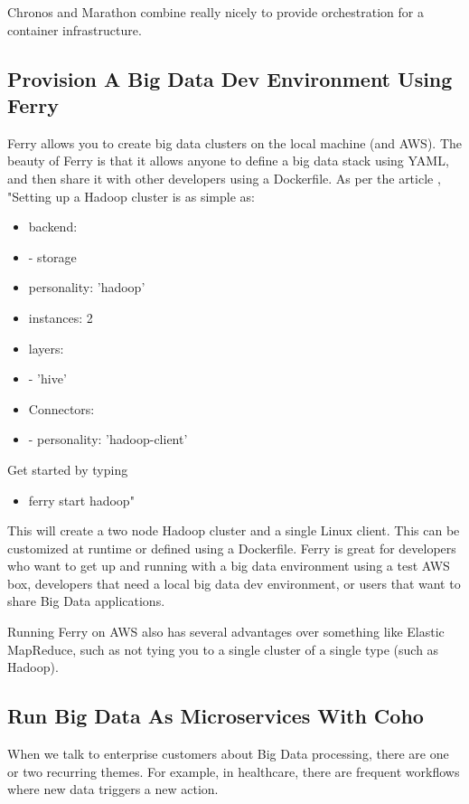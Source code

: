 \documentclass[sigconf]{acmart}
\begin{document}
	Chronos and Marathon combine really nicely to provide orchestration for a container infrastructure.
	
	\subsection{Provision A Big Data Dev Environment Using Ferry}
	Ferry allows you to create big data clusters on the local machine (and AWS). The beauty of Ferry is that it allows anyone to define a big data stack using YAML, and then share it with other developers using a Dockerfile.
	As per the article \cite{Ferry}, "Setting up a Hadoop cluster is as simple as:
	
	
	\begin{itemize}
		\item[]\noindent backend:
		\item[] - storage 
		\item[] personality: 'hadoop'
		\item[] instances: 2
		\item[] layers:
		\item[] - 'hive'
		\item[]\noindent Connectors: 
		\item[] - personality: 'hadoop-client'
	\end{itemize}	
	
	Get started by typing
	
	\begin{itemize}
		\item[] ferry start hadoop"
	\end{itemize}	
	
	
	This will create a two node Hadoop cluster and a single Linux client. This can be customized at runtime or defined using a Dockerfile.
	Ferry is great for developers who want to get up and running with a big data environment using a test AWS box, developers that need a local big data dev environment, or users that want to share Big Data applications.
	
	Running Ferry on AWS also has several advantages over something like Elastic MapReduce, such as not tying you to a single cluster of a single type (such as Hadoop).
	
	\subsection{Run Big Data As Microservices With Coho}
	When we talk to enterprise customers about Big Data processing, there are one or two recurring themes. For example, in healthcare, there are frequent workflows where new data triggers a new action.
	
\end{document}
